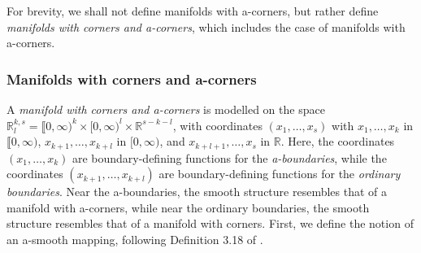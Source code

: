 \documentclass[10pt, a4paper]{article}
\theoremstyle{plain}%
\theoremstyle{definition}
\numberwithin{figure}{section}
\numberwithin{equation}{section}
\begin{document}
For brevity, we shall not define manifolds with a-corners, but rather define \textit{manifolds with corners and a-corners}, which includes the case of manifolds with a-corners.

\subsubsection{Manifolds with corners and a-corners}

A \textit{manifold with corners and a-corners} is modelled on the space $\mathbb{R}^{k,s}_l = \llbracket0,\infty)^k\times [0,\infty)^l\times \mathbb{R}^{s-k-l}$, with coordinates $(x_1,\dots,x_s)$ with $x_1,\dots,x_k$ in $\llbracket 0,\infty)$, $x_{k+1},\dots,x_{k+l}$ in $[0,\infty)$, and $x_{k+l+1},\dots, x_{s}$ in $\mathbb{R}$. Here, the coordinates $(x_1,\dots,x_k)$ are boundary-defining functions for the \textit{a-boundaries}, while the coordinates $(x_{k+1},\dots, x_{k+l})$ are boundary-defining functions for the \textit{ordinary boundaries}. Near the a-boundaries, the smooth structure resembles that of a manifold with a-corners, while near the ordinary boundaries, the smooth structure resembles that of a manifold with corners. First, we define the notion of an a-smooth mapping, following Definition 3.18 of \cite{Joy16}.
\end{document}
